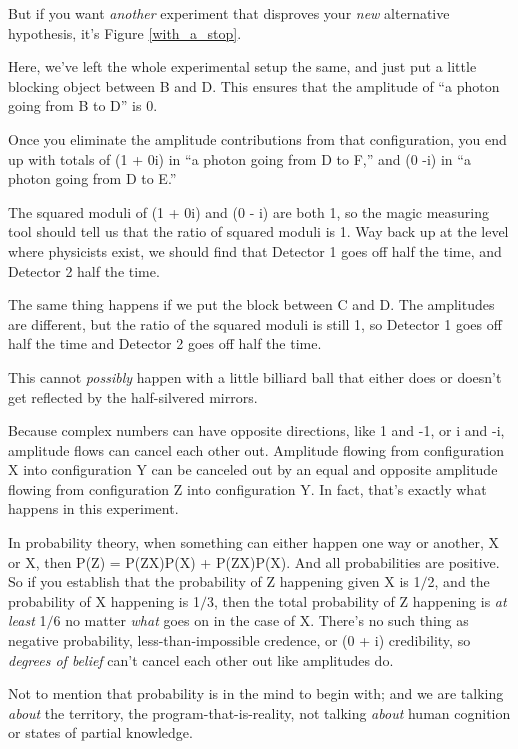 {
 But if you want \textit{another} experiment that disproves your
\textit{new} alternative hypothesis, it's Figure \ref{with_a_stop}.}


{
 Here, we've left the whole experimental setup the
same, and just put a little blocking object between B and D. This
ensures that the amplitude of ``a photon going from B
to D'' is 0.}

{
 Once you eliminate the amplitude contributions from that
configuration, you end up with totals of (1 + 0i) in
``a photon going from D to F,'' and
(0 -i) in ``a photon going from D to
E.''}

{
 The squared moduli of (1 + 0i) and (0 - i) are both 1, so the
magic measuring tool should tell us that the ratio of squared moduli is
1. Way back up at the level where physicists exist, we should find that
Detector 1 goes off half the time, and Detector 2 half the time.}

{
 The same thing happens if we put the block between C and D. The
amplitudes are different, but the ratio of the squared moduli is still
1, so Detector 1 goes off half the time and Detector 2 goes off half
the time.}

{
 This cannot \textit{possibly} happen with a little billiard ball
that either does or doesn't get reflected by the
half-silvered mirrors.}

{
 Because complex numbers can have opposite directions, like 1 and
-1, or i and -i, amplitude flows can cancel each other out. Amplitude
flowing from configuration X into configuration Y can be canceled out
by an equal and opposite amplitude flowing from configuration Z into
configuration Y. In fact, that's exactly what happens
in this experiment.}

{
 In probability theory, when something can either happen one way or
another, X or {\textlnot}X, then P(Z) = P(Z{\textbar}X)P(X) +
P(Z{\textbar}{\textlnot}X)P({\textlnot}X). And all probabilities are
positive. So if you establish that the probability of Z happening given
X is 1$/$2, and the probability of X happening is 1$/$3, then the total
probability of Z happening is \textit{at least} 1$/$6 no matter
\textit{what} goes on in the case of {\textlnot}X.
There's no such thing as negative probability,
less-than-impossible credence, or (0 + i) credibility, so
\textit{degrees of belief} can't cancel each other out
like amplitudes do.}

{
 Not to mention that probability is in the mind to begin with; and
we are talking \textit{about} the territory, the
program-that-is-reality, not talking \textit{about} human cognition or
states of partial knowledge.}

